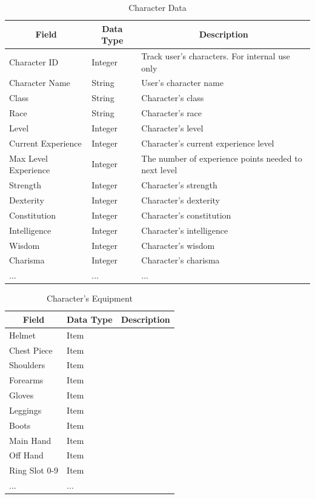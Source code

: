 \documentclass[12pt,letterpaper]{article}
\begin{document}
	\begin{table}[h]
		\centering
		\begin{tabular}{| l | l | p{7cm} |}
			\hline
			\multicolumn{1}{|c|}{\bf{Field}} & \multicolumn{1}{|c|}{\bf{Data Type}} & \multicolumn{1}{|c|}{\bf{Description}}\\ \hline
			Character ID & Integer & Track user's characters. For internal use only \\ \hline
			Character Name & String & User's character name \\ \hline
			Class & String & Character's class \\ \hline
			Race & String & Character's race \\ \hline
			Level & Integer & Character's level \\ \hline
			Current Experience & Integer & Character's current experience level \\ \hline
			Max Level Experience & Integer & The number of experience points needed to next level \\ \hline
			Strength & Integer & Character's strength \\ \hline
			Dexterity & Integer & Character's dexterity \\ \hline
			Constitution & Integer & Character's constitution \\ \hline
			Intelligence & Integer & Character's intelligence \\ \hline
			Wisdom & Integer & Character's wisdom \\ \hline
			Charisma & Integer & Character's charisma \\ \hline
			... & ... & ... \\ \hline
			\hline

		\end{tabular}
		\caption{Character Data}
		\label{tab:tableCharaterData}
	\end{table}			

	\begin{table}[h]
		\centering
		\begin{tabular}{| l | l | p{7cm} |}
			\hline
			\multicolumn{1}{|c|}{\bf{Field}} & \multicolumn{1}{|c|}{\bf{Data Type}} & \multicolumn{1}{|c|}{\bf{Description}}\\ \hline
			Helmet & Item & \\ \hline
			Chest Piece & Item & \\ \hline
			Shoulders & Item & \\ \hline
			Forearms & Item & \\ \hline
			Gloves & Item & \\ \hline
			Leggings & Item & \\ \hline
			Boots & Item & \\ \hline
			Main Hand & Item & \\ \hline
			Off Hand & Item & \\ \hline
			Ring Slot 0-9 & Item & \\ \hline
			... & ... & \\ \hline
		\end{tabular}
		\caption{Character's Equipment}
		\label{tab:tableCharacterEquipment}
	\end{table}			
\end{document}
